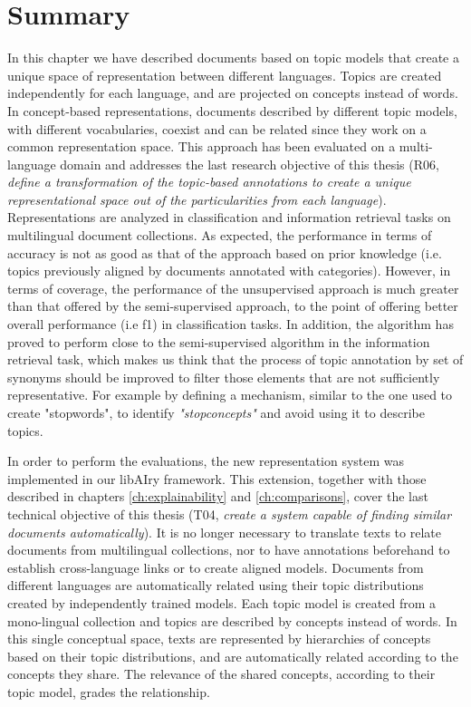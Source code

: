 \section{Summary}
\label{sec:crosslingual-summary}
In this chapter we have described documents based on topic models that create a unique space of representation between different languages. Topics are created independently for each language, and are projected on concepts instead of words. In concept-based representations, documents described by different topic models, with different vocabularies, coexist and can be related since they work on a common representation space. This approach has been evaluated on a multi-language domain and addresses the last research objective of this thesis (R06, \textit{define a transformation of the topic-based annotations to create a unique representational space out of the particularities from each language}). Representations are analyzed in classification and information retrieval tasks on multilingual document collections. As expected, the performance in terms of accuracy is not as good as that of the approach based on prior knowledge (i.e. topics previously aligned by documents annotated with categories). However, in terms of coverage, the performance of the unsupervised approach is much greater than that offered by the semi-supervised approach, to the point of offering better overall performance (i.e f1) in classification tasks. 
In addition, the algorithm has proved to perform close to the semi-supervised algorithm in the information retrieval task, which makes us think that the process of topic annotation by set of synonyms should be improved to filter those elements that are not sufficiently representative. For example by defining a mechanism, similar to the one used to create "stopwords", to identify \textit{"stopconcepts"} and avoid using it to describe topics. 

In order to perform the evaluations, the new representation system was implemented in our libAIry framework. This extension, together with those described in chapters \ref{ch:explainability} and \ref{ch:comparisons}, cover the last technical objective of this thesis (T04, \textit{create a system capable of finding similar documents automatically}). It is no longer necessary to translate texts to relate documents from multilingual collections, nor to have annotations beforehand to establish cross-language links or to create aligned models. Documents from different languages are automatically related using their topic distributions created by independently trained models. Each topic model is created from a mono-lingual collection and topics are described by concepts instead of words. In this single conceptual space, texts are represented by hierarchies of concepts based on their topic distributions, and are automatically related according to the concepts they share. The relevance of the shared concepts, according to their topic model, grades the relationship.
